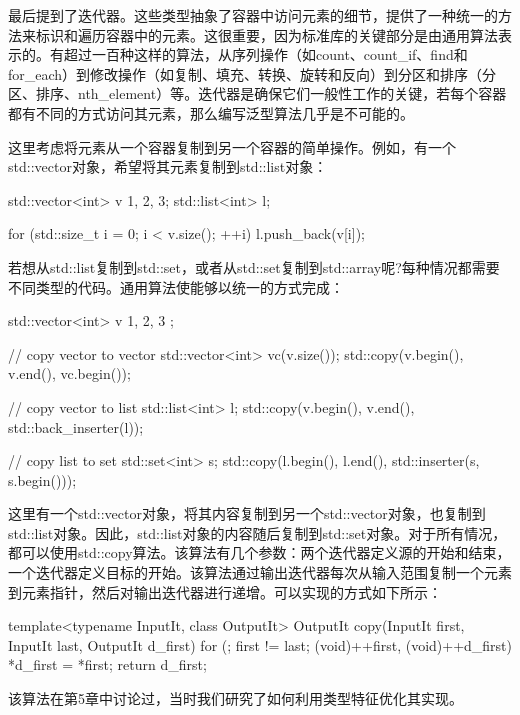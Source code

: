 最后提到了迭代器。这些类型抽象了容器中访问元素的细节，提供了一种统一的方法来标识和遍历容器中的元素。这很重要，因为标准库的关键部分是由通用算法表示的。有超过一百种这样的算法，从序列操作（如count、count\_if、find和for\_each）到修改操作（如复制、填充、转换、旋转和反向）到分区和排序（分区、排序、nth\_element）等。迭代器是确保它们一般性工作的关键，若每个容器都有不同的方式访问其元素，那么编写泛型算法几乎是不可能的。

这里考虑将元素从一个容器复制到另一个容器的简单操作。例如，有一个std::vector对象，希望将其元素复制到std::list对象：

\begin{cpp}
std::vector<int> v {1, 2, 3};
std::list<int> l;

for (std::size_t i = 0; i < v.size(); ++i)
	l.push_back(v[i]);
\end{cpp}

若想从std::list复制到std::set，或者从std::set复制到std::array呢?每种情况都需要不同类型的代码。通用算法使能够以统一的方式完成：

\begin{cpp}
std::vector<int> v{ 1, 2, 3 };

// copy vector to vector
std::vector<int> vc(v.size());
std::copy(v.begin(), v.end(), vc.begin());

// copy vector to list
std::list<int> l;
std::copy(v.begin(), v.end(), std::back_inserter(l));

// copy list to set
std::set<int> s;
std::copy(l.begin(), l.end(), std::inserter(s, s.begin()));
\end{cpp}

这里有一个std::vector对象，将其内容复制到另一个std::vector对象，也复制到std::list对象。因此，std::list对象的内容随后复制到std::set对象。对于所有情况，都可以使用std::copy算法。该算法有几个参数：两个迭代器定义源的开始和结束，一个迭代器定义目标的开始。该算法通过输出迭代器每次从输入范围复制一个元素到元素指针，然后对输出迭代器进行递增。可以实现的方式如下所示：

\begin{cpp}
template<typename InputIt, class OutputIt>
OutputIt copy(InputIt first, InputIt last,
			  OutputIt d_first)
{
	for (; first != last; (void)++first, (void)++d_first)
	{
		*d_first = *first;
	}
	return d_first;
}
\end{cpp}

\begin{important}
该算法在第5章中讨论过，当时我们研究了如何利用类型特征优化其实现。
\end{important}

